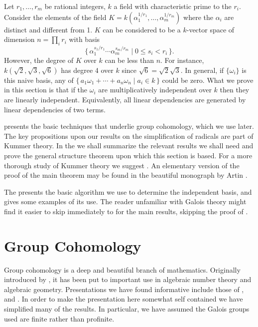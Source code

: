 \medskip
Let $r_1, \ldots, r_m$ be rational
integers, $k$ a field with characteristic prime to the $r_i$. Consider
the elements of the field $K = k(\alpha_1^{1/r_1}, \ldots,
\alpha_m^{1/r_m})$ where the $\alpha_i$ are distinct and different
from 1.  $K$ can be considered to be a $k$-vector space of dimension
$n = \prod_i r_i$ with basis
\[
\{\,\alpha_1^{s_1/r_1} \cdots \alpha_m^{s_m/r_m} \mid 0 \le s_i < r_i\,\}.
\]
However, the degree of $K$ over $k$ can be less than $n$.  For
instance, $k(\sqrt{2}, \sqrt{3}, \sqrt{6})$ has degree 4 over $k$
since $\sqrt{6} = \sqrt{2} \sqrt{3}$.  In general, if $\{\omega_i\}$
is this naive basis, any of $\{\,a_1 \omega_1 + \cdots + a_n \omega_n
\mid a_i \in k\,\}$ could be zero.  What we prove in this section is that
if the $\omega_i$ are multiplicatively independent over $k$ then they
are linearly independent.  Equivalently, all linear dependencies are
generated by linear dependencies of two terms.

 presents the basic techniques that underlie
group cohomology, which we use later.  The key propositions upon our
results on the simplification of radicals are part of Kummer theory.  In
the  we shall summarize the relevant
results we shall need and prove the general structure theorem upon which
this section is based.  For a more thorough study of Kummer theory we
suggest \cite{Artin:Tate,Lang:ANT,Serre:Corps:Locaux}.  An elementary
version of the proof of the main theorem may be found in the beautiful
monograph by Artin \cite{Artin:Galois}.

The  presents the basic algorithm we use to
determine the independent basis, and  gives
some examples of its use.  The reader unfamiliar with Galois theory might
find it easier to skip immediately to  for
the main results, skipping the proof of .

\section{Group Cohomology}
\label{Group:Cohomology:Sec}

Group cohomology is a deep and beautiful branch of mathematics.
Originally introduced by {\Grothendieck} \cite{Grothendieck:Tohoku},
it has been put to important use in algebraic number theory and
algebraic geometry.  Presentations we have found informative include
those of {\Lang} \cite{Lang:ANT,Lang:Cohomology}, {\SchatzS}
\cite{Schatz:Profinite} and {\Serre} \cite{Serre:Corps:Locaux}.  In
order to make the presentation here somewhat self contained we have
simplified many of the results.  In particular, we have assumed the
Galois groups used are finite rather than profinite.

